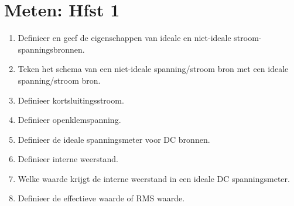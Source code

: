 \documentclass[12pt]{article}
\begin{document}
    \maketitle

	\section{Meten: Hfst 1}%
	\label{sec:Meten:_Hfst_1}

	\begin{enumerate}
		\item Definieer en geef de eigenschappen van ideale en niet-ideale stroom- spanningsbronnen.
		\item Teken het schema van een niet-ideale spanning/stroom bron met een ideale spanning/stroom bron.
		\item Definieer kortsluitingsstroom.
		\item Definieer openklemspanning.
		\item Definieer de ideale spanningsmeter voor DC bronnen.
		\item Definieer interne weerstand.
		\item Welke waarde krijgt de interne weerstand in een ideale DC spanningsmeter.
		\item Definieer de effectieve waarde of RMS waarde.
	\end{enumerate}
	
\end{document}
